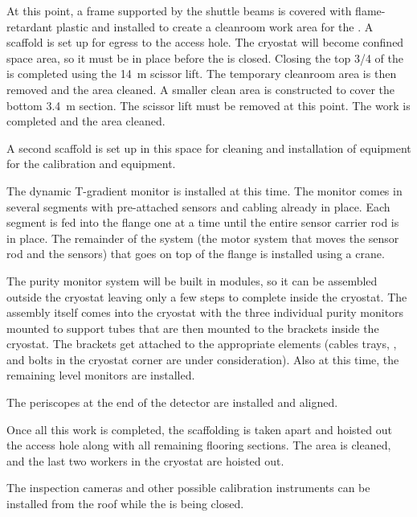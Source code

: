 At this point, a frame supported by the shuttle beams is covered with flame-retardant plastic and installed to create a cleanroom work area for the .  A scaffold is set up for egress to the access hole. %
The cryostat will become confined space area, so it  must be in place before the  is closed.  Closing the top 3/4 of the  is completed using the \SI{14}{m} scissor lift. The temporary cleanroom area is then removed and the area cleaned. A smaller clean area is constructed %
to cover the bottom \SI{3.4}{m}   section.  The scissor lift must be removed at this point. The  work is completed and the area cleaned. 

A second scaffold is set up in this space  for cleaning and installation of equipment for the calibration and  equipment.

The dynamic T-gradient monitor is installed at this time. 
The monitor comes in several segments with pre-attached sensors and cabling already in place. Each segment is fed into the flange  one at a time until the entire sensor carrier rod is in place. The remainder of the system (the motor system that moves the sensor rod and the sensors) that goes on top of the flange is installed using a crane. 

The purity monitor system will be built in modules, so it can be assembled outside the cryostat leaving only a few steps to complete inside the cryostat. 
The assembly itself comes into the cryostat with the three individual purity monitors mounted to support tubes that are then mounted to the brackets inside the cryostat. The brackets get attached to the appropriate elements (cables trays, , and bolts in the cryostat corner are under consideration). Also at this time, the remaining level monitors are installed.

The periscopes at the end of the detector are installed and aligned. 

Once all this work is completed, the scaffolding is taken apart and hoisted out the access hole along with all remaining flooring sections. The area is cleaned, and the last two workers %
in the cryostat are hoisted out. 

The inspection cameras and other possible calibration instruments can be installed from the roof while the  is being closed. 

